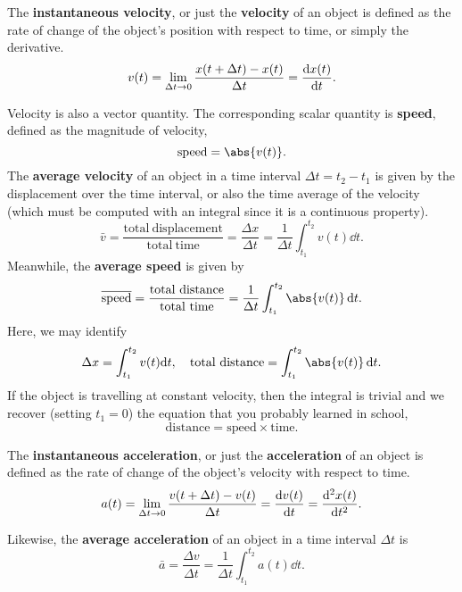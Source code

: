 \documentclass[../classical_mechanics.tex]{subfiles}
\begin{document}
        \begin{definition}
            The \textbf{instantaneous velocity}, or just the \textbf{velocity} of an object is defined as the rate of change of the object's position with respect to time, or simply the derivative.
            \begin{equation}
                v(t)=\lim_{\Delta t\to0}\frac{x(t+\Delta t)-x(t)}{\Delta t}=\dv{x(t)}{t}.
            \end{equation}
        \end{definition}
        Velocity is also a vector quantity.
        The corresponding scalar quantity is \textbf{speed}, defined as the magnitude of velocity,
        \begin{equation}
            \mathrm{speed}=\abs{v(t)}.
        \end{equation}
        The \textbf{average velocity} of an object in a time interval $\Delta t=t_2-t_1$ is given by the displacement over the time interval, or also the time average of the velocity (which must be computed with an integral since it is a continuous property).
        \begin{equation}
            \bar{v}=\frac{\mathrm{total\ displacement}}{\mathrm{total\ time}}=\frac{\Delta x}{\Delta t}=\frac{1}{\Delta t}\int_{t_1}^{t_2}v(t)\dd{t}.
        \end{equation}
        Meanwhile, the \textbf{average speed} is given by
        \begin{equation}
            \overline{\mathrm{speed}}=\frac{\mathrm{total\ distance}}{\mathrm{total\ time}}=\frac{1}{\Delta t}\int_{t_1}^{t_2}\abs{v(t)}\dd{t}.
        \end{equation}
        Here, we may identify
        \begin{equation}\label{eq:total-disp}
            \Delta x=\int_{t_1}^{t_2}v(t)\mathrm{d}t,\quad \mathrm{total\ distance}=\int_{t_1}^{t_2}\abs{v(t)}\dd{t}.
        \end{equation}
        If the object is travelling at constant velocity, then the integral is trivial and we recover (setting $t_1=0$) the equation that you probably learned in school,
        \begin{equation}
            \mathrm{distance}=\mathrm{speed}\times\mathrm{time}.
        \end{equation}
        \begin{definition}
            The \textbf{instantaneous acceleration}, or just the \textbf{acceleration} of an object is defined as the rate of change of the object's velocity with respect to time.
            \begin{equation}
                a(t)=\lim_{\Delta t\to0}\frac{v(t+\Delta t)-v(t)}{\Delta t}=\dv{v(t)}{t}=\dv[2]{x(t)}{t}.
            \end{equation}
        \end{definition}
        Likewise, the \textbf{average acceleration} of an object in a time interval $\Delta t$ is
        \begin{equation}\label{eq:average-acc}
            \bar{a}=\frac{\Delta v}{\Delta t}=\frac{1}{\Delta t}\int_{t_1}^{t_2}a(t)\dd{t}.
        \end{equation}
\end{document}
